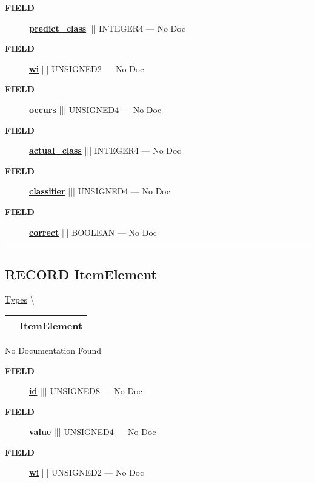 \par
\begin{description}
\item [\colorbox{tagtype}{\color{white} \textbf{\textsf{FIELD}}}] \textbf{\underline{predict\_class}} ||| INTEGER4 --- No Doc
\item [\colorbox{tagtype}{\color{white} \textbf{\textsf{FIELD}}}] \textbf{\underline{wi}} ||| UNSIGNED2 --- No Doc
\item [\colorbox{tagtype}{\color{white} \textbf{\textsf{FIELD}}}] \textbf{\underline{occurs}} ||| UNSIGNED4 --- No Doc
\item [\colorbox{tagtype}{\color{white} \textbf{\textsf{FIELD}}}] \textbf{\underline{actual\_class}} ||| INTEGER4 --- No Doc
\item [\colorbox{tagtype}{\color{white} \textbf{\textsf{FIELD}}}] \textbf{\underline{classifier}} ||| UNSIGNED4 --- No Doc
\item [\colorbox{tagtype}{\color{white} \textbf{\textsf{FIELD}}}] \textbf{\underline{correct}} ||| BOOLEAN --- No Doc
\end{description}





\rule{\linewidth}{0.5pt}
\subsection*{\textsf{\colorbox{headtoc}{\color{white} RECORD}
ItemElement}}

\hypertarget{ecldoc:ml_core.types.itemelement}{}
\hspace{0pt} \hyperlink{ecldoc:ML_Core.Types}{Types} \textbackslash 

{\renewcommand{\arraystretch}{1.5}
\begin{tabularx}{\textwidth}{|>{\raggedright\arraybackslash}l|X|}
\hline
\hspace{0pt}\mytexttt{\color{red} } & \textbf{ItemElement} \\
\hline
\end{tabularx}
}

\par





No Documentation Found







\par
\begin{description}
\item [\colorbox{tagtype}{\color{white} \textbf{\textsf{FIELD}}}] \textbf{\underline{id}} ||| UNSIGNED8 --- No Doc
\item [\colorbox{tagtype}{\color{white} \textbf{\textsf{FIELD}}}] \textbf{\underline{value}} ||| UNSIGNED4 --- No Doc
\item [\colorbox{tagtype}{\color{white} \textbf{\textsf{FIELD}}}] \textbf{\underline{wi}} ||| UNSIGNED2 --- No Doc
\end{description}





